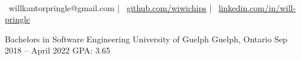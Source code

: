 \documentclass[]{awesome-cv}
\begin{document}
    
\begin{center}
	\headerfirstnamestyle{}  \\
	\vspace{2mm}
	{\faEnvelope\ willkantorpringle@gmail.com} | {\faGithub\ \href{https://github.com/wiwichips}{github.com/wiwichips}} | {\faLinkedin\ \href{https://www.linkedin.com/in/will-pringle/}{linkedin.com/in/will-pringle}}
\end{center}
\begin{cventries}
	\cventry
	{Bachelors in Software Engineering}
	{University of Guelph}
	{Guelph, Ontario}
	{Sep 2018 – April 2022}
	{GPA: 3.65}
\end{cventries}
\end{document}
